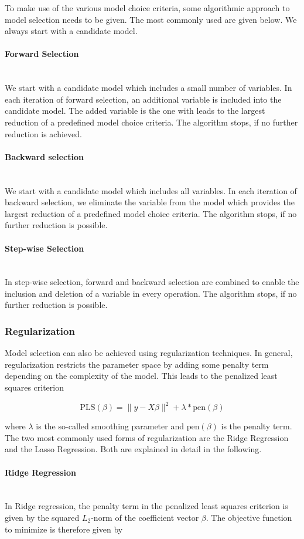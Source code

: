 \documentclass[10pt,a4paper]{article}
\newcommand{\subsubsubsection}[1]{\paragraph{#1}\mbox{}\\}
\begin{document}
To make use of the various model choice criteria, some algorithmic approach to model selection needs to be given. The most commonly used are given below. We always start with a candidate model. 

\subsubsubsection{Forward Selection}

We start with a candidate model which includes a small number of variables. In each iteration of forward selection, an additional variable is included into the candidate model.  The added variable is the one with leads to the largest reduction of a predefined model choice criteria. The algorithm stops, if no further reduction is achieved.

\subsubsubsection{Backward selection}

We start with a candidate model which includes all variables. In each iteration of backward selection, we eliminate the variable from the model which provides the largest reduction of a predefined model choice criteria. The algorithm stops, if no further reduction is possible. 

\subsubsubsection{Step-wise Selection}

In step-wise selection, forward and backward selection are combined to enable the inclusion and deletion of a variable in every operation. The algorithm stops, if no further reduction is possible.

\subsubsection{Regularization}

Model selection can also be achieved using regularization techniques. In general, regularization restricts the parameter space by adding some penalty term depending on the complexity of the model. This leads to the penalized least squares criterion

$$\text{PLS}(\beta) = \lVert y - X\beta\rVert^2 + \lambda *\text{pen}(\beta)$$

where $\lambda$ is the so-called smoothing parameter and $\text{pen}(\beta)$ is the penalty term. The two most commonly used forms of regularization are the Ridge Regression and the Lasso Regression. Both are explained in detail in the following.

\subsubsubsection{Ridge Regression}

In Ridge regression, the penalty term in the penalized least squares criterion is given by the squared $L_2$-norm of the coefficient vector $\beta$. The objective function to minimize is therefore given by
\end{document}
